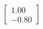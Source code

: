 \documentclass[preview]{standalone}
\begin{document}
\begin{align*}
\begin{bmatrix} 1.00 \\ -0.80 \end{bmatrix}
\end{align*}
\end{document}
